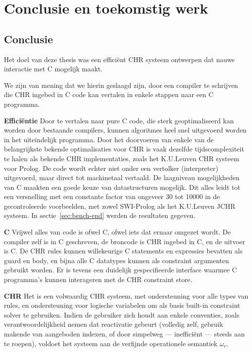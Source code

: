 \chapter{Conclusie en toekomstig werk} \label{chap:concl}

\section{Conclusie} \label{sec:concl}

Het doel van deze thesis was een effici\"ent CHR systeem ontwerpen dat nauwe interactie met C mogelijk maakt.

We zijn van mening dat we hierin geslaagd zijn, door een compiler te schrijven die CHR ingebed in C code kan vertalen in enkele stappen naar een C programma.

{\bf Effici\"entie} Door te vertalen naar pure C code, die sterk geoptimaliseerd kan worden door bestaande compilers, kunnen algoritmes heel snel uitgevoerd worden in het uiteindelijk programma. Door het doorvoeren van enkele van de belangrijkste bekende optimalisaties voor CHR is vaak dezelfde tijdscomplexiteit te halen als bekende CHR implementaties, zoals het K.U.Leuven CHR systeem voor Prolog. De code wordt echter niet onder een vertolker (interpreter) uitgevoerd, maar direct tot machinetaal vertaald. De laagniveau mogelijkheden van C maakten een goede keuze van datastructuren mogelijk. Dit alles leidt tot een versnelling met een constante factor van ongeveer 30 tot 10000 in de gecontroleerde voorbeelden, met zowel SWI-Prolog als het K.U.Leuven JCHR systeem. In sectie~\ref{sec:bench-end} werden de resultaten gegeven.

{\bf C} Vrijwel alles van code is ofwel C, ofwel iets dat ernaar omgezet wordt. De compiler zelf is in C geschreven, de broncode is CHR ingebed in C, en de uitvoer is C. De CHR rules kunnen willekeurige C statements en expressies bevatten als guard en body, en bijna alle C datatypes kunnen als constraint argumenten gebruikt worden. Er is tevens een duidelijk gespecifieerde interface waarmee C programma's kunnen interageren met de CHR constraint store.

{\bf CHR} Het is een volwaardig CHR systeem, met ondersteuning voor alle types van rules, en ondersteuning voor logische variabelen om als basis built-in constraint solver te gebruiken. Indien de gebruiker zich houdt aan enkele conventies, zoals verantwoordelijkheid nemen dat reactivatie gebeurt (volledig zelf, gebruik makende van aangeboden indexen, of door simpelweg --- ineffici\"ent --- steeds  aan te roepen), voldoet het systeem aan de verfijnde operationele semantiek $\omega_r$.

